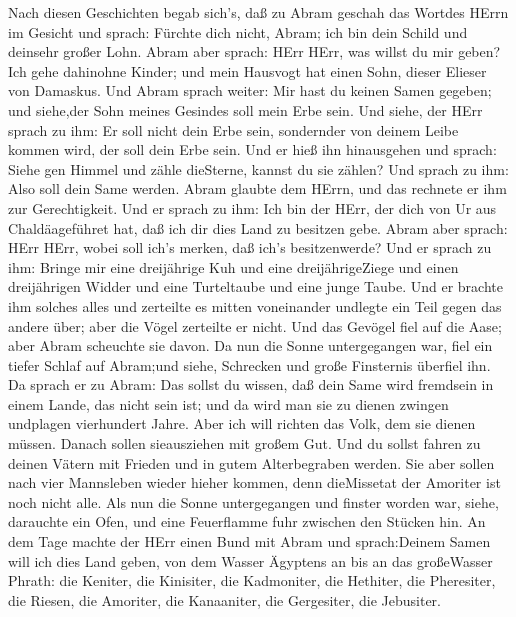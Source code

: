  Nach diesen Geschichten begab sich's, daß zu Abram geschah
das Wortdes HErrn im Gesicht und sprach: Fürchte dich nicht, Abram; ich
bin dein Schild und deinsehr großer Lohn.  Abram aber
sprach: HErr HErr, was willst du mir geben? Ich gehe dahinohne Kinder;
und mein Hausvogt hat einen Sohn, dieser Elieser von Damaskus.
 Und Abram sprach weiter: Mir hast du keinen Samen gegeben;
und siehe,der Sohn meines Gesindes soll mein Erbe sein.  Und
siehe, der HErr sprach zu ihm: Er soll nicht dein Erbe sein, sondernder
von deinem Leibe kommen wird, der soll dein Erbe sein.  Und
er hieß ihn hinausgehen und sprach: Siehe gen Himmel und zähle
dieSterne, kannst du sie zählen? Und sprach zu ihm: Also soll dein Same
werden.  Abram glaubte dem HErrn, und das rechnete er ihm
zur Gerechtigkeit.  Und er sprach zu ihm: Ich bin der HErr,
der dich von Ur aus Chaldäageführet hat, daß ich dir dies Land zu
besitzen gebe.  Abram aber sprach: HErr HErr, wobei soll
ich's merken, daß ich's besitzenwerde?  Und er sprach zu
ihm: Bringe mir eine dreijährige Kuh und eine dreijährigeZiege und einen
dreijährigen Widder und eine Turteltaube und eine junge Taube.
 Und er brachte ihm solches alles und zerteilte es mitten
voneinander undlegte ein Teil gegen das andere über; aber die Vögel
zerteilte er nicht.  Und das Gevögel fiel auf die Aase;
aber Abram scheuchte sie davon.  Da nun die Sonne
untergegangen war, fiel ein tiefer Schlaf auf Abram;und siehe, Schrecken
und große Finsternis überfiel ihn.  Da sprach er zu Abram:
Das sollst du wissen, daß dein Same wird fremdsein in einem Lande, das
nicht sein ist; und da wird man sie zu dienen zwingen undplagen
vierhundert Jahre.  Aber ich will richten das Volk, dem sie
dienen müssen. Danach sollen sieausziehen mit großem Gut. 
Und du sollst fahren zu deinen Vätern mit Frieden und in gutem
Alterbegraben werden.  Sie aber sollen nach vier Mannsleben
wieder hieher kommen, denn dieMissetat der Amoriter ist noch nicht alle.
 Als nun die Sonne untergegangen und finster worden war,
siehe, darauchte ein Ofen, und eine Feuerflamme fuhr zwischen den
Stücken hin.  An dem Tage machte der HErr einen Bund mit
Abram und sprach:Deinem Samen will ich dies Land geben, von dem Wasser
Ägyptens an bis an das großeWasser Phrath:  die Keniter,
die Kinisiter, die Kadmoniter,  die Hethiter, die
Pheresiter, die Riesen,  die Amoriter, die Kanaaniter, die
Gergesiter, die Jebusiter.

